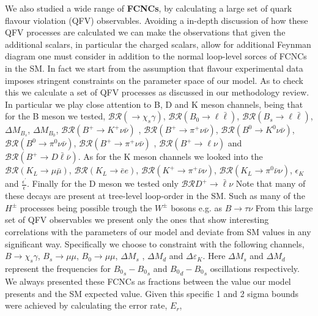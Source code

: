We also studied a wide range of \textbf{FCNCs}, by calculating a large set of quark flavour violation (QFV) observables. 
%
Avoiding a in-depth discussion of how these QFV processes are calculated we can make the observations that given the additional scalars, in particular the charged scalars, allow for additional Feynman diagram one must consider in addition to the normal loop-level sorces of FCNCs in the SM. 
%
In fact we start from the assumption that flavour experimental data imposes stringent constraints on the parameter space of our model. 
%
As to check this we calculate a set of QFV processes as discussed in our methodology review.
%
In particular we play close attention to B, D and K meson channels, being that for  the B meson we tested, 
$\mathcal{BR} \left( \rightarrow \chi_s \gamma \right)$, 
$\mathcal{BR} \left( B_0 \rightarrow \ell \bar{\ell} \right)$, 
$\mathcal{BR} \left( B_s \rightarrow \ell \bar{\ell} \right)$, 
$\Delta M_{B_s}$, 
$\Delta M_{B_0}$, 
$\mathcal{BR} \left( B^+ \rightarrow K^+\nu\bar{\nu} \right)$ , 
$\mathcal{BR} \left( B^+ \rightarrow \pi^+\nu\bar{\nu} \right)$, 
$\mathcal{BR} \left( B^0 \rightarrow K^0\nu\bar{\nu} \right)$,  
$\mathcal{BR} \left( B^0 \rightarrow \pi^0 \nu\bar{\nu} \right)$, 
$\mathcal{BR} \left( B^+ \rightarrow \pi^+\nu\bar{\nu} \right)$ , 
$\mathcal{BR} \left( B^+ \rightarrow \ell \nu \right)$ and
$\mathcal{BR} \left( B^+ \rightarrow D \bar{\ell} \bar{\nu} \right)$. 
%
As for the K meson channels we looked into the $\mathcal{BR} \left( K_L \rightarrow \mu \bar{\mu} \right)$,  $\mathcal{BR} \left( K_L \rightarrow \bar{e} e \right)$,  $\mathcal{BR} \left( K^+ \rightarrow \pi^+ \bar{\nu} \nu \right)$, $\mathcal{BR} \left( K_L \rightarrow \pi^0 \bar{\nu} \nu \right)$, $\epsilon_K$ and $\frac{\epsilon^\prime}{\epsilon}$. 
%
Finally for the D meson we tested only $\mathcal{BR} D^+ \rightarrow \bar{\ell} \nu$
%
Note that many of these decays are present at tree-level loop-order in the SM. { \color{blue} Such as many of the $H^\pm$ processes being possible trough the $W^\pm$ bosons e.g. as $B \rightarrow \tau \nu$ }
%
From this large set of QFV observables we present only the ones that show interesting correlations with the parameters of our model and deviate from SM values in any significant way.
%
Specifically we choose to constraint with the following channels, $B \rightarrow \chi_s \gamma$, $B_s \rightarrow \mu \mu$, $B_0 \rightarrow  \mu \mu$, $\Delta M_s$ , $\Delta M_d$ and $\Delta \varepsilon_K$. 
%
Here $\Delta M_s$ and $\Delta M_d$ represent the frequencies for ${B_0}_s - {B_0}_s$ and ${B_0}_d - {B_0}_s$ oscillations respectively. 
%
We always presented these FCNCs as fractions between the value our model presents and the SM expected value. 
%
Given this specific 1 and 2 sigma bounds were achieved by calculating the error rate, $E_r$, 

